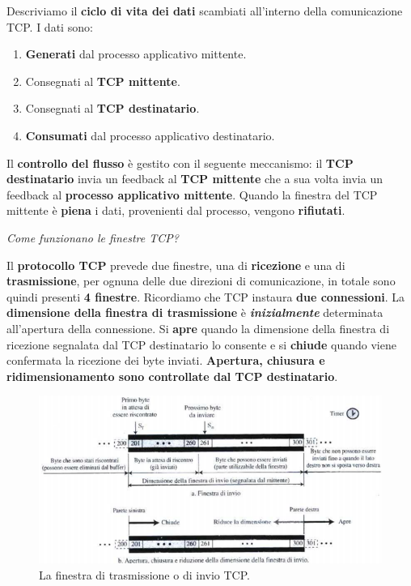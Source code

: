 \documentclass[11pt,a4paper]{article}
\theoremstyle{definition}
\begin{document}
Descriviamo il \textbf{ciclo di vita dei dati} scambiati all'interno della comunicazione TCP. I dati sono:
\begin{enumerate}
	\item \textbf{Generati} dal processo applicativo mittente.
	\item Consegnati al \textbf{TCP mittente}.
	\item Consegnati al \textbf{TCP destinatario}.
	\item \textbf{Consumati} dal processo applicativo destinatario.
\end{enumerate}
Il \textbf{controllo del flusso} è gestito con il seguente meccanismo: il \textbf{TCP destinatario} invia un feedback al \textbf{TCP mittente} che a sua volta invia un feedback al \textbf{processo applicativo mittente}. Quando la finestra del TCP mittente è \textbf{piena} i dati, provenienti dal processo, vengono \textbf{rifiutati}.
\newpage
\begin{flushleft}
	\textit{Come funzionano le finestre TCP?}
\end{flushleft}
Il \textbf{protocollo TCP} prevede due finestre, una di \textbf{ricezione} e una di \textbf{trasmissione}, per ognuna delle due direzioni di comunicazione, in totale sono quindi presenti \textbf{4 finestre}. Ricordiamo che TCP instaura \textbf{due connessioni}. La \textbf{dimensione della finestra di trasmissione} è \textit{\textbf{inizialmente}} determinata all'apertura della connessione. Si \textbf{apre} quando la dimensione della finestra di ricezione segnalata dal TCP destinatario lo consente e si \textbf{chiude} quando viene confermata la ricezione dei byte inviati. \textbf{Apertura, chiusura e ridimensionamento sono controllate dal TCP destinatario}.
\begin{figure}[!h]
	\includegraphics[scale=0.55]{Immagini/TCP_Window.png}
	\centering
	\caption{La finestra di trasmissione o di invio TCP.}
\end{figure}\newline
\end{document}
